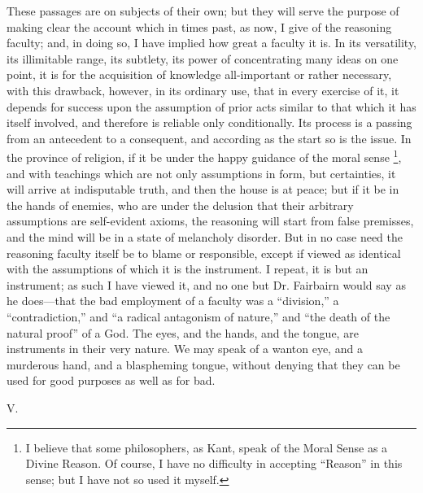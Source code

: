These passages are on subjects of their own; but they will serve
the purpose of making clear the account which in times past, as now, I
give of the reasoning faculty; and, in doing so, I have implied how
great a faculty it is. In its versatility, its illimitable range, its
subtlety, its power of concentrating many ideas on one point, it is
for the acquisition of knowledge all-important or rather necessary,
with this drawback, however, in its ordinary use, that in every
exercise of it, it depends for success upon the assumption of prior
acts similar to that which it has itself involved, and therefore is
reliable only conditionally. Its process is a passing from an
antecedent to a consequent, and according as the start so is the
issue. In the province of religion, if it be under the happy guidance
of the moral sense \footnote{I believe that some philosophers, as Kant, speak of the Moral
Sense as a Divine Reason. Of course, I have no difficulty in accepting
``Reason'' in this sense; but I have not so used it myself.}, and
with teachings which are not only assumptions in form, but
certainties, it will arrive at indisputable truth, and then the house
is at peace; but if it be in the hands of enemies, who are under the
delusion that their arbitrary assumptions are self-evident axioms, the
reasoning will start from false premisses, and the mind will be in a
state of melancholy disorder. But in no case need the reasoning
faculty itself be to blame or responsible, except if viewed as
identical with the assumptions of which it is the instrument. I
repeat, it is but an instrument; as such I have viewed it, and no one
but Dr. Fairbairn would say as he does—that the bad employment of a
faculty was a ``division,'' a ``contradiction,'' and
``a radical antagonism of nature,'' and ``the death of the
natural proof'' of a God. The eyes, and the hands, and the tongue,
are instruments in their very nature. We may speak of a wanton eye,
and a murderous hand, and a blaspheming tongue, without denying that
they can be used for good purposes as well as for bad.

V.

